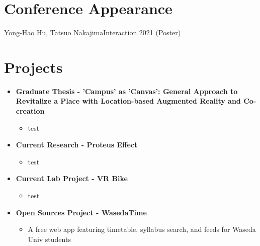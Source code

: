 \section{Conference Appearance}
\vspace{5pt}
\resumeSubHeadingListStart
{}
{Yong-Hao Hu, Tatsuo Nakajima}{Interaction 2021 (Poster)}
\resumeSubHeadingListEnd
\vspace{5pt}

\section{Projects}
\vspace{5pt}
\begin{itemize}[leftmargin=*]
    \item{\textbf{Graduate Thesis - 'Campus' as 'Canvas': General Approach to Revitalize a Place with Location-based Augmented Reality and Co-creation}}
        \begin{itemize}
                \vspace{-5pt}
                \item test
        \end{itemize}
    \vspace{-10pt}
    \item{\textbf{Current Research - Proteus Effect}}
        \begin{itemize}
                \vspace{-5pt}
                \item test
        \end{itemize}
    \vspace{-10pt}
    \item{\textbf{Current Lab Project - VR Bike}}
        \begin{itemize}
                \vspace{-5pt}
                \item test
        \end{itemize}
    \vspace{-10pt}
    \item{\textbf{Open Sources Project - WasedaTime}}
        \begin{itemize}
                \vspace{-5pt}
                \item A free web app featuring timetable, syllabus search, and feeds for Waseda Univ students

\end{itemize}
\end{itemize}
